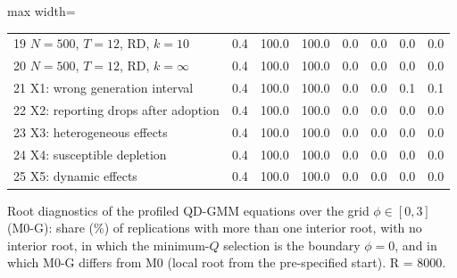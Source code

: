 \begin{table}[!t]
\begin{adjustbox}{max width=\linewidth}
\begin{tabular}{lrrrrrrr}
19 $N=500$, $T=12$, RD, $k=10$ & 0.4 & 100.0 & 100.0 & 0.0 & 0.0 & 0.0 & 0.0 \\
20 $N=500$, $T=12$, RD, $k=\infty$ & 0.4 & 100.0 & 100.0 & 0.0 & 0.0 & 0.0 & 0.0 \\
21 X1: wrong generation interval & 0.4 & 100.0 & 100.0 & 0.0 & 0.0 & 0.1 & 0.1 \\
22 X2: reporting drops after adoption & 0.4 & 100.0 & 100.0 & 0.0 & 0.0 & 0.0 & 0.0 \\
23 X3: heterogeneous effects & 0.4 & 100.0 & 100.0 & 0.0 & 0.0 & 0.0 & 0.0 \\
24 X4: susceptible depletion & 0.4 & 100.0 & 100.0 & 0.0 & 0.0 & 0.0 & 0.0 \\
25 X5: dynamic effects & 0.4 & 100.0 & 100.0 & 0.0 & 0.0 & 0.0 & 0.0 \\
\bottomrule
\end{tabular}
\end{adjustbox}
\par\smallskip\parbox{\linewidth}{\scriptsize Root diagnostics of the profiled QD-GMM equations over the grid $\phi\in[0,3]$ (M0-G): share (\%) of replications with more than one interior root, with no interior root, in which the minimum-$Q$ selection is the boundary $\phi=0$, and in which M0-G differs from M0 (local root from the pre-specified start). R = 8000.}
\end{table}

